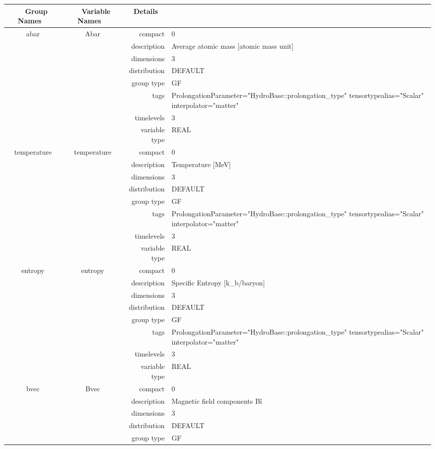 \begin{tabular*}{150mm}{|c|c@{\extracolsep{\fill}}|rl|} \hline 
~ {\bf Group Names} ~ & ~ {\bf Variable Names} ~  &{\bf Details} ~ & ~ \\ 
\hline 
abar & Abar & compact & 0 \\ 
 &  & description & Average atomic mass [atomic mass unit] \\ 
 &  & dimensions & 3 \\ 
 &  & distribution & DEFAULT \\ 
 &  & group type & GF \\ 
 &  & tags & ProlongationParameter="HydroBase::prolongation\_type" tensortypealias="Scalar" interpolator="matter" \\ 
 &  & timelevels & 3 \\ 
 &  & variable type & REAL \\ 
\hline 
temperature & temperature & compact & 0 \\ 
 &  & description & Temperature [MeV] \\ 
 &  & dimensions & 3 \\ 
 &  & distribution & DEFAULT \\ 
 &  & group type & GF \\ 
 &  & tags & ProlongationParameter="HydroBase::prolongation\_type" tensortypealias="Scalar" interpolator="matter" \\ 
 &  & timelevels & 3 \\ 
 &  & variable type & REAL \\ 
\hline 
entropy & entropy & compact & 0 \\ 
 &  & description & Specific Entropy [k\_b/baryon] \\ 
 &  & dimensions & 3 \\ 
 &  & distribution & DEFAULT \\ 
 &  & group type & GF \\ 
 &  & tags & ProlongationParameter="HydroBase::prolongation\_type" tensortypealias="Scalar" interpolator="matter" \\ 
 &  & timelevels & 3 \\ 
 &  & variable type & REAL \\ 
\hline 
bvec & Bvec & compact & 0 \\ 
 &  & description & Magnetic field components B\^i \\ 
 &  & dimensions & 3 \\ 
 &  & distribution & DEFAULT \\ 
 &  & group type & GF \\ 

\end{tabular*}
